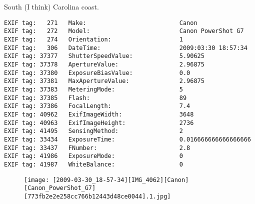 \section{\protect{}}
\noindent South (I think) Carolina coast.
\noindent
\begin{lstlisting}
EXIF tag:   271   Make:                          Canon
EXIF tag:   272   Model:                         Canon PowerShot G7
EXIF tag:   274   Orientation:                   1
EXIF tag:   306   DateTime:                      2009:03:30 18:57:34
EXIF tag: 37377   ShutterSpeedValue:             5.90625
EXIF tag: 37378   ApertureValue:                 2.96875
EXIF tag: 37380   ExposureBiasValue:             0.0
EXIF tag: 37381   MaxApertureValue:              2.96875
EXIF tag: 37383   MeteringMode:                  5
EXIF tag: 37385   Flash:                         89
EXIF tag: 37386   FocalLength:                   7.4
EXIF tag: 40962   ExifImageWidth:                3648
EXIF tag: 40963   ExifImageHeight:               2736
EXIF tag: 41495   SensingMethod:                 2
EXIF tag: 33434   ExposureTime:                  0.016666666666666666
EXIF tag: 33437   FNumber:                       2.8
EXIF tag: 41986   ExposureMode:                  0
EXIF tag: 41987   WhiteBalance:                  0

\end{lstlisting}
\clearpage
\begin{figure}
\raggedleft
\texttt{[image: [2009-03-30\_18-57-34][IMG\_4062][Canon][Canon\_PowerShot\_G7][773fb2e2e258cc766b12443d48ce0044].1.jpg]}
\end{figure}


\clearpage
